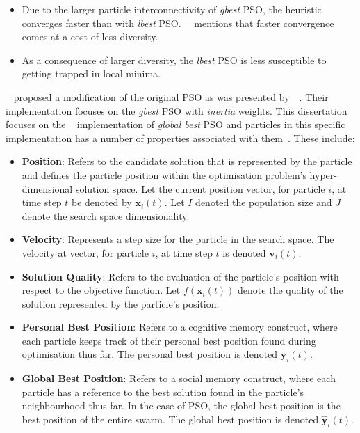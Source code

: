 \begin{itemize}
      \item Due to the larger particle interconnectivity of \textit{gbest} \acs{PSO}, the heuristic converges faster than with \textit{lbest} \acs{PSO}.~\citeauthor{ref:engelbrecht:2007}~\cite{ref:engelbrecht:2007} mentions that faster convergence comes at a cost of less diversity.

      \item As a consequence of larger diversity, the \textit{lbest} \acs{PSO} is less susceptible to getting trapped in local minima.
\end{itemize}

\citeauthor{ref:shi:1998}~\cite{ref:shi:1998} proposed a modification of the original \acs{PSO} as was presented by~\citeauthor{ref:kennedy:1995}~\cite{ref:kennedy:1995}. Their implementation focuses on the \textit{gbest} \acs{PSO} with \textit{inertia} weights. This dissertation focuses on the \citeauthor{ref:shi:1998}~\cite{ref:shi:1998} implementation of \textit{global best} \acs{PSO} and particles in this specific implementation has a number of properties associated with them~\cite{ref:vanwyk:2014}. These include:

\begin{itemize}
      \item \textbf{Position}: Refers to the candidate solution that is represented by the particle and defines the particle position within the optimisation problem's hyper-dimensional solution space. Let the current position vector, for particle $i$, at time step $t$ be denoted by $\boldsymbol{x}_{i}(t)$. Let $I$ denoted the population size and $J$ denote the search space dimensionality.

      \item \textbf{Velocity}: Represents a step size for the particle in the search space. The velocity at vector, for particle $i$, at time step $t$ is denoted $\boldsymbol{v}_{i}(t)$.

      \item \textbf{Solution Quality}: Refers to the evaluation of the particle's position with respect to the objective function. Let $f(\boldsymbol{x}_{i}(t))$ denote the quality of the solution represented by the particle's position.

      \item \textbf{Personal Best Position}: Refers to a cognitive memory construct, where each particle keeps track of their personal best position found during optimisation thus far. The personal best position is denoted $\boldsymbol{y}_{i}(t)$.

      \item \textbf{Global Best Position}: Refers to a social memory construct, where each particle has a reference to the best solution found in the particle's neighbourhood thus far. In the case of  \acs{PSO}, the global best position is the best position of the entire swarm. The global best position is denoted $\boldsymbol{\hat{y}}_{i}(t)$.
\end{itemize}

